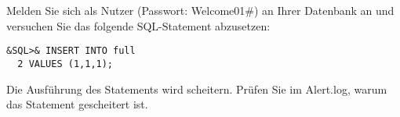     \item Melden Sie sich als Nutzer  (Passwort: Welcome01\#) an Ihrer Datenbank an und versuchen Sie das folgende SQL-Statement abzusetzen:
    \begin{lstlisting}[language=oracle_sql]
&SQL>& INSERT INTO full
  2 VALUES (1,1,1);
    \end{lstlisting}
    Die Ausf\"uhrung des Statements wird scheitern. Pr\"ufen Sie im Alert.log, warum das Statement gescheitert ist.
